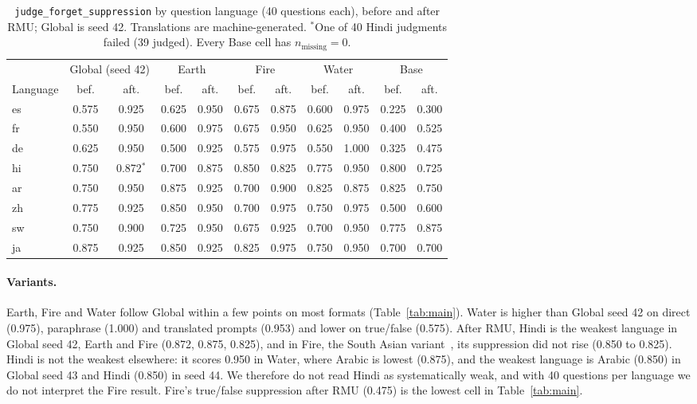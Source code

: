 \documentclass[10pt,twocolumn]{article}
\newcommand{\code}[1]{\texttt{#1}}
\newcommand{\FJ}{\code{judge\_forget\_suppression}}
\begin{document}
\begin{table}[t]
\centering\footnotesize
\setlength{\tabcolsep}{4pt}
\begin{tabular}{@{}lcccccccccc@{}}
\toprule
& \multicolumn{2}{c}{Global (seed 42)} & \multicolumn{2}{c}{Earth} & \multicolumn{2}{c}{Fire} & \multicolumn{2}{c}{Water} & \multicolumn{2}{c}{Base}\\
\cmidrule(lr){2-3}\cmidrule(lr){4-5}\cmidrule(lr){6-7}\cmidrule(lr){8-9}\cmidrule(lr){10-11}
Language & bef. & aft. & bef. & aft. & bef. & aft. & bef. & aft. & bef. & aft.\\
\midrule
es & 0.575 & 0.925 & 0.625 & 0.950 & 0.675 & 0.875 & 0.600 & 0.975 & 0.225 & 0.300\\
fr & 0.550 & 0.950 & 0.600 & 0.975 & 0.675 & 0.950 & 0.625 & 0.950 & 0.400 & 0.525\\
de & 0.625 & 0.950 & 0.500 & 0.925 & 0.575 & 0.975 & 0.550 & 1.000 & 0.325 & 0.475\\
hi & 0.750 & 0.872$^\ast$ & 0.700 & 0.875 & 0.850 & 0.825 & 0.775 & 0.950 & 0.800 & 0.725\\
ar & 0.750 & 0.950 & 0.875 & 0.925 & 0.700 & 0.900 & 0.825 & 0.875 & 0.825 & 0.750\\
zh & 0.775 & 0.925 & 0.850 & 0.950 & 0.700 & 0.975 & 0.750 & 0.975 & 0.500 & 0.600\\
sw & 0.750 & 0.900 & 0.725 & 0.950 & 0.675 & 0.925 & 0.700 & 0.950 & 0.775 & 0.875\\
ja & 0.875 & 0.925 & 0.850 & 0.925 & 0.825 & 0.975 & 0.750 & 0.950 & 0.700 & 0.700\\
\bottomrule
\end{tabular}
\caption{\FJ{} by question language (40 questions each), before and after RMU; Global is seed 42. Translations are machine-generated. $^\ast$One of 40 Hindi judgments failed (39 judged). Every Base cell has $n_\text{missing}=0$.}
\label{tab:lang}
\end{table}

\paragraph{Variants.} Earth, Fire and Water follow Global within a few points on most formats (Table~\ref{tab:main}). Water is higher than Global seed 42 on direct (0.975), paraphrase (1.000) and translated prompts (0.953) and lower on true/false (0.575). After RMU, Hindi is the weakest language in Global seed 42, Earth and Fire (0.872, 0.875, 0.825), and in Fire, the South Asian variant~\cite{salamanca2026tinyaya}, its suppression did not rise (0.850 to 0.825). Hindi is not the weakest elsewhere: it scores 0.950 in Water, where Arabic is lowest (0.875), and the weakest language is Arabic (0.850) in Global seed 43 and Hindi (0.850) in seed 44. We therefore do not read Hindi as systematically weak, and with 40 questions per language we do not interpret the Fire result. Fire's true/false suppression after RMU (0.475) is the lowest cell in Table~\ref{tab:main}.
\end{document}
